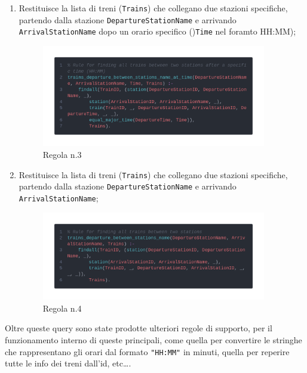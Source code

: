 \documentclass[italian,12pt,a4paper]{article}
\begin{document}
\begin{enumerate}
\begin{figure}[h]
						\end{figure}
						\newpage
					\item Restituisce la lista di treni (\texttt{Trains}) che collegano due stazioni specifiche, partendo dalla stazione \texttt{DepartureStationName} e arrivando \texttt{ArrivalStationName} dopo un orario specifico ()\texttt{Time} nel foramto HH:MM);
						\begin{figure}[h]
							\centering
							\includegraphics[width=370px]{img/code4}
							\caption{Regola n.3}
			
						\end{figure}
					\item Restituisce la lista di treni (\texttt{Trains}) che collegano due stazioni specifiche, partendo dalla stazione \texttt{DepartureStationName} e arrivando \texttt{ArrivalStationName};
						\begin{figure}[h]
							\centering
							\includegraphics[width=370px]{img/code3}
							\caption{Regola n.4}
			
						\end{figure}
							
				\end{enumerate}
						
			Oltre queste query sono state prodotte ulteriori regole di supporto, per il funzionamento interno di queste principali, come quella per convertire le stringhe che rappresentano gli orari dal formato \texttt{"HH:MM"} in minuti, quella per reperire tutte le info dei treni dall'id, etc\dots.
\end{document}
